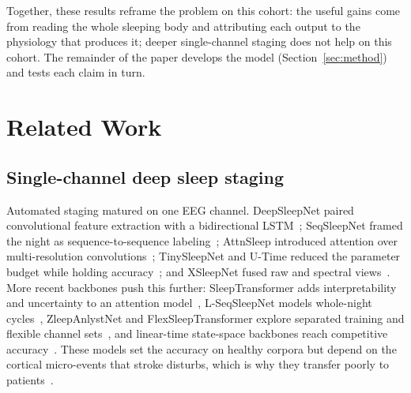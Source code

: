 \documentclass[preprint,12pt]{elsarticle}
\begin{document}
Together, these results reframe the problem on this cohort: the useful gains come from reading
the whole sleeping body and attributing each output to the physiology that produces it;
deeper single-channel staging does not help on this cohort. The remainder of the paper develops the model
(Section~\ref{sec:method}) and tests each claim in turn.

\section{Related Work}
\label{sec:related}

\subsection{Single-channel deep sleep staging}
Automated staging matured on one EEG channel. DeepSleepNet paired convolutional feature
extraction with a bidirectional LSTM~\cite{supratak2017deepsleepnet}; SeqSleepNet framed the
night as sequence-to-sequence labeling~\cite{phan2019seqsleepnet}; AttnSleep introduced
attention over multi-resolution convolutions~\cite{eldele2021attnsleep}; TinySleepNet and
U-Time reduced the parameter budget while holding
accuracy~\cite{supratak2020tinysleepnet,perslev2019utime}; and XSleepNet fused raw and
spectral views~\cite{phan2021xsleepnet}. More recent backbones push this further: SleepTransformer
adds interpretability and uncertainty to an attention model~\cite{sleeptransformer2022}, L-SeqSleepNet
models whole-night cycles~\cite{lseqsleepnet2023}, ZleepAnlystNet and FlexSleepTransformer explore
separated training and flexible channel sets~\cite{jirakittayakorn2024zleep,guo2024flexsleep}, and
linear-time state-space backbones reach competitive accuracy~\cite{gu2023mamba,bitmamsleep2024}.
These models set the accuracy on healthy corpora but
depend on the cortical micro-events that stroke disturbs, which is why they transfer poorly to
patients~\cite{bose2026gap}.
\end{document}

